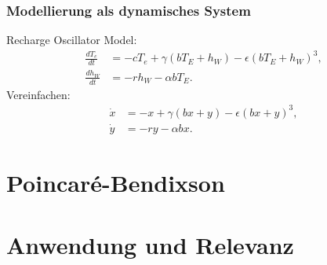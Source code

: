 \documentclass[ngerman, aspectratio=169]{beamer}
\begin{document}
    \begin{frame}
        \frametitle{Modellierung als dynamisches System}
        Recharge Oscillator Model:
        \begin{align*}
            \frac{dT_e}{dt} &= -cT_e + \gamma \left(bT_E + h_W\right) - \epsilon \left(bT_E + h_W\right)^3, \\
            \frac{dh_W}{dt} &= -rh_W - \alpha b T_E.
        \end{align*}
        \pause
        Vereinfachen:
        \begin{align*}
            \dot{x} &= -x + \gamma \left(bx + y\right) - \epsilon \left(bx + y\right)^3, \\
            \dot{y} &= -ry - \alpha b x.
        \end{align*}
    \end{frame}

	\section{Poincaré-Bendixson}

    \section{Anwendung und Relevanz}
\end{document}
